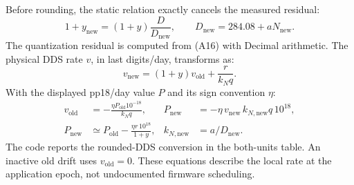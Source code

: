 \documentclass[11pt,a4paper]{article}
\renewcommand{\_}{\usscore\allowbreak}
\begin{document}
Before rounding, the static relation exactly cancels the measured residual:
\begin{equation}
1+y_{\mathrm{new}}=(1+y)\frac{D}{D_{\mathrm{new}}},\qquad
D_{\mathrm{new}}=284.08+aN_{\mathrm{new}}. \tag{A16}\label{eq:A16}
\end{equation}
The quantization residual is computed from (A16) with Decimal arithmetic.
The physical DDS rate \(v\), in last digits/day, transforms as:
\begin{equation}
v_{\mathrm{new}}=(1+y)v_{\mathrm{old}}+\frac{r}{k_Nq}. \tag{A17}\label{eq:A17}
\end{equation}
With the displayed pp18/day value \(P\) and its sign convention \(\eta\):
\begin{align}
v_{\mathrm{old}}&=-\frac{\eta P_{\mathrm{old}}10^{-18}}{k_Nq},&
P_{\mathrm{new}}&=-\eta\,v_{\mathrm{new}}\,k_{N,\mathrm{new}}q\,10^{18}, \tag{A18}\label{eq:A18}\\
P_{\mathrm{new}}&\simeq P_{\mathrm{old}}-
       \frac{\eta r\,10^{18}}{1+y},&
k_{N,\mathrm{new}}&=a/D_{\mathrm{new}}. \tag{A19}\label{eq:A19}
\end{align}
The code reports the rounded-DDS conversion in the both-units table.
An inactive old drift uses \(v_{\mathrm{old}}=0\). These equations describe
the local rate at the application epoch, not undocumented firmware scheduling.
\clearpage
\end{document}
